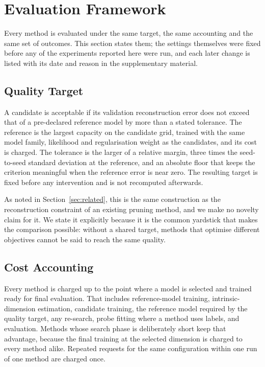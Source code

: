 \documentclass[make,article,submit,pdftex,moreauthors]{Definitions/mdpi}
\begin{document}

\section{Evaluation Framework}\label{sec:framework}

Every method is evaluated under the same target, the same accounting and
the same set of outcomes. This section states them; the settings
themselves were fixed before any of the experiments reported here were
run, and each later change is listed with its date and reason in the
supplementary material.

\subsection{Quality Target}\label{sec:framework_quality}

A candidate is acceptable if its validation reconstruction error does not
exceed that of a pre-declared reference model by more than a stated
tolerance. The reference is the largest capacity on the candidate grid,
trained with the same model family, likelihood and regularisation weight
as the candidates, and its cost is charged. The tolerance is the larger of
a relative margin, three times the seed-to-seed standard deviation at the
reference, and an absolute floor that keeps the criterion meaningful when
the reference error is near zero. The resulting target is fixed before any
intervention and is not recomputed afterwards.

As noted in Section~\ref{sec:related}, this is the same construction as
the reconstruction constraint of an existing pruning method, and we make
no novelty claim for it. We state it explicitly because it is the common
yardstick that makes the comparison possible: without a shared target,
methods that optimise different objectives cannot be said to reach the
same quality.

\subsection{Cost Accounting}\label{sec:framework_cost}

Every method is charged up to the point where a model is selected and
trained ready for final evaluation. That includes reference-model
training, intrinsic-dimension estimation, candidate training, the
reference model required by the quality target, any re-search, probe
fitting where a method uses labels, and evaluation. Methods whose search
phase is deliberately short keep that advantage, because the final
training at the selected dimension is charged to every method alike.
Repeated requests for the same configuration within one run of one method
are charged once.
\end{document}
